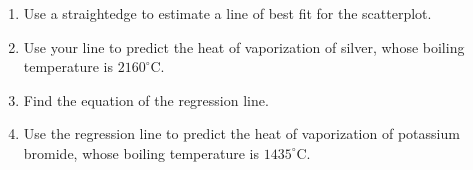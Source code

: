 \documentclass[10pt,]{book}
\theoremstyle{plain}
\theoremstyle{definition}
\theoremstyle{definition}
\theoremstyle{definition}
\theoremstyle{definition}
\numberwithin{equation}{part}
\newcommand\degree[0]{^{\circ}}
\begin{document}
\begin{exerciselist}
 \leavevmode%
\begin{enumerate}[label=*\alph**]
\item\hypertarget{li-1692}{}Use a straightedge to estimate a line of best fit for the scatterplot.%
\item\hypertarget{li-1693}{}Use your line to predict the heat of vaporization of silver, whose boiling temperature is \(2160\degree\)C.%
\item\hypertarget{li-1694}{}Find the equation of the regression line.%
\item\hypertarget{li-1695}{}Use the regression line to predict the heat of vaporization of potassium bromide, whose boiling temperature is \(1435\degree\)C.%
\end{enumerate}
%
\par\smallskip
\end{exerciselist}
\typeout{************************************************}
\typeout{************************************************}
\end{document}
